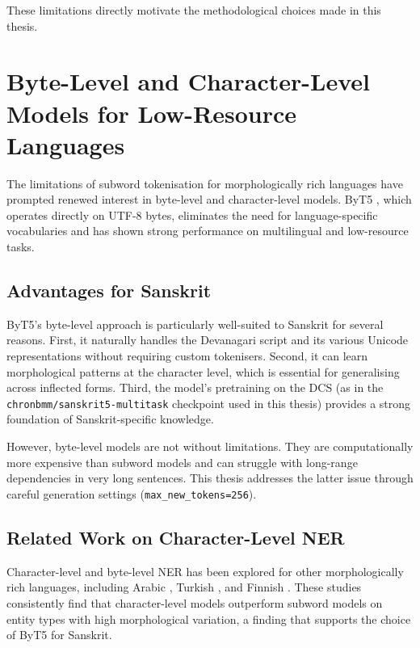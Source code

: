 These limitations directly motivate the methodological choices made in this thesis.

\section{Byte-Level and Character-Level Models for Low-Resource Languages}
\label{sec:byte_level}

The limitations of subword tokenisation for morphologically rich languages have prompted renewed interest in byte-level and character-level models. ByT5 \cite{xue2022byt5}, which operates directly on UTF-8 bytes, eliminates the need for language-specific vocabularies and has shown strong performance on multilingual and low-resource tasks.

\subsection{Advantages for Sanskrit}
\label{subsec:byt5_sanskrit}

ByT5's byte-level approach is particularly well-suited to Sanskrit for several reasons. First, it naturally handles the Devanagari script and its various Unicode representations without requiring custom tokenisers. Second, it can learn morphological patterns at the character level, which is essential for generalising across inflected forms. Third, the model's pretraining on the DCS (as in the \texttt{chronbmm/sanskrit5-multitask} checkpoint used in this thesis) provides a strong foundation of Sanskrit-specific knowledge.

However, byte-level models are not without limitations. They are computationally more expensive than subword models and can struggle with long-range dependencies in very long sentences. This thesis addresses the latter issue through careful generation settings (\texttt{max\_new\_tokens=256}).

\subsection{Related Work on Character-Level NER}
\label{subsec:character_ner}

Character-level and byte-level NER has been explored for other morphologically rich languages, including Arabic \cite{alsmadi2019arabic}, Turkish \cite{gungor2018turkish}, and Finnish \cite{kanerva2020finnish}. These studies consistently find that character-level models outperform subword models on entity types with high morphological variation, a finding that supports the choice of ByT5 for Sanskrit.

